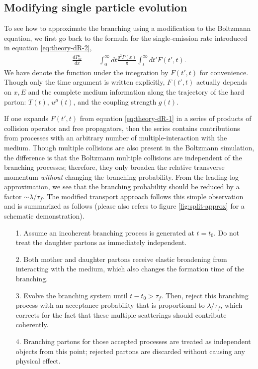 \subsection{Modifying single particle evolution}
To see how to approximate the branching using a modification to the Boltzmann equation, we first go back to the formula for the single-emission rate introduced in equation \ref{eq:theory-dR-2},
\begin{eqnarray}
\frac{dP^{a}_{bc}}{dx} &=& \int_0^\infty dt \frac{g^2 P(x)}{\pi} \int_t^\infty dt'  F(t', t).
\label{eq:full-theory}
\end{eqnarray}
We have denote the function under the integration by $F(t', t)$ for convenience. 
Though only the time argument is written explicitly, $F(t', t)$ actually depends on $x, E$ and the complete medium information along the trajectory of the hard parton: $T(t)$, $u^\mu(t)$, and the coupling strength $g(t)$.

If one expands $F(t',t)$ from equation \ref{eq:theory-dR-1} in a series of products of collision operator and free propagators, then the series contains contributions from processes with an arbitrary number of multiple-interaction with the medium.
Though multiple collisions are also present in the Boltzmann simulation, the difference is that the Boltzmann multiple collisions are independent of the branching processes; therefore, they only broaden the relative transverse momentum {\it without} changing the branching probability.
From the leading-log approximation, we see that the branching probability should be reduced by a factor $\sim \lambda/\tau_f$.
The modified transport approach follows this simple observation and is summarized as follows (please also refers to figure \ref{fig:split-approx} for a schematic demonstration).
\begin{itemize}
\item[1.] Assume an incoherent branching process is generated at $t=t_0$. Do not treat the daughter partons as immediately independent.
\item[2.] Both mother and daughter partons receive elastic broadening from interacting with the medium, which also changes the formation time of the branching.
\item[3.] Evolve the branching system until $t-t_0 > \tau_f$. Then, reject this branching process with an acceptance probability that is proportional to $\lambda/\tau_f$, which corrects for the fact that these multiple scatterings should contribute coherently.
\item[4.] Branching partons for those accepted processes are treated as independent objects from this point; rejected partons are discarded without causing any physical effect.
\end{itemize}

